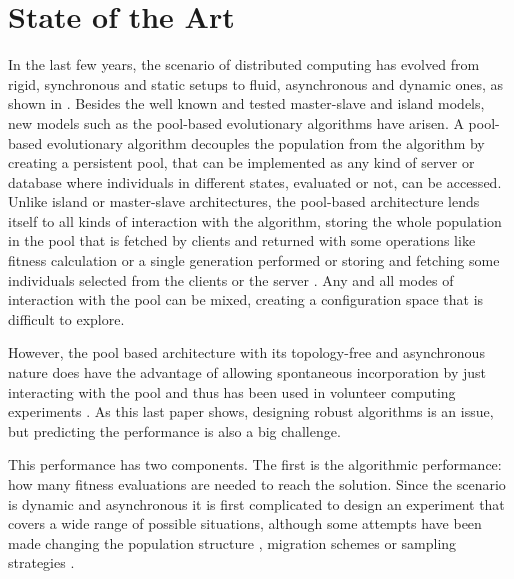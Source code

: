 \documentclass[runningheads,a4paper]{llncs}
\begin{document}

\section{State of the Art}
\label{sec:sota}

In the last few years, the scenario of distributed computing has
evolved from rigid, synchronous and static setups to fluid, asynchronous and dynamic ones, as
shown in \cite{gong2015distributed}. Besides the well known and tested
master-slave and island models, new models such as the pool-based
evolutionary algorithms
\cite{roy2009distributed,bollini1999distributed,sofea:evopar2012,sofea:naco}
have arisen. A pool-based evolutionary algorithm decouples the population
from the algorithm by creating a persistent pool, that can be implemented as any kind
of server or database where individuals in different states, evaluated
or not, can be accessed. Unlike island or master-slave architectures,
the pool-based architecture lends itself to all kinds of interaction
with the algorithm, storing the whole population in the pool that is
fetched by clients and returned with some operations like fitness
calculation or a single generation performed
\cite{nogueras2015self,garcia2014unreliable} or storing and fetching some
individuals selected from the clients or the server
\cite{DBLP:conf/3pgcic/GuervosMFEL12}. Any and all modes of
interaction with the pool can be mixed, creating a configuration space
that is difficult to explore.

However, the pool based architecture with its topology-free and
asynchronous nature does have the advantage of
allowing spontaneous incorporation by just interacting with the pool
and thus has been used in volunteer computing experiments
\cite{daniel:euromicro09,DBLP:journals/corr/abs-0801-1210,DBLP:journals/gpem/LaredoBGVAGF14}. As
this last paper shows, designing robust algorithms is an issue, but
predicting the performance is also a big challenge.


This performance has two components. The first is the algorithmic  
performance: how many fitness evaluations are needed to reach the
solution. Since the scenario is dynamic and asynchronous it is first
complicated to design an experiment that covers a wide range of
possible situations, although some attempts have been made changing
the population structure \cite{DBLP:conf/lion/LaredoGFMACG11},
migration schemes \cite{hijaze2014investigating} or sampling
strategies \cite{nogueras2015self}. 
\end{document}
